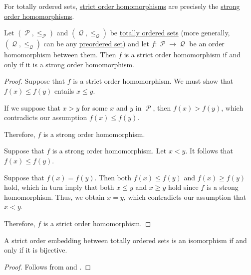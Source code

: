 \begin{proposition}\label{thm:totally_ordered_strong_homomorphism}
  For totally ordered sets, \hyperref[thm:partially_ordered_set/homomorphism]{strict order homomorphisms} are precisely the \hyperref[rem:first_order_strong_homomorphism]{strong order homomorphisms}.

  Let \( (\mscrP, \leq_\mscrP) \) and \( (\mscrQ, \leq_\mscrQ) \) be \hyperref[def:totally_ordered_set]{totally ordered sets} (more generally, \( (\mscrQ, \leq_\mscrQ) \) can be any \hyperref[def:preordered_set]{preordered set}) and let \( f: \mscrP \to \mscrQ \) be an order homomorphism between them. Then \( f \) is a strict order homomorphism if and only if it is a strong order homomorphism.
\end{proposition}
\begin{proof}
  \SufficiencySubProof Suppose that \( f \) is a strict order homomorphism. We must show that \( f(x) \leq f(y) \) entails \( x \leq y \).

  If we suppose that \( x > y \) for some \( x \) and \( y \) in \( \mscrP \), then \( f(x) > f(y) \), which contradicts our assumption \( f(x) \leq f(y) \).

  Therefore, \( f \) is a strong order homomorphism.

  \NecessitySubProof Suppose that \( f \) is a strong order homomorphism. Let \( x < y \). It follows that \( f(x) \leq f(y) \).

  Suppose that \( f(x) = f(y) \). Then both \( f(x) \leq f(y) \) and \( f(x) \geq f(y) \) hold, which in turn imply that both \( x \leq y \) and \( x \geq y \) hold since \( f \) is a strong homomorphism. Thus, we obtain \( x = y \), which contradicts our assumption that \( x < y \).

  Therefore, \( f \) is a strict order homomorphism.
\end{proof}

\begin{corollary}\label{thm:totally_ordered_strict_isomorphisms}
  A strict order embedding between totally ordered sets is an isomorphism if and only if it is bijective.
\end{corollary}
\begin{proof}
  Follows from  and .
\end{proof}

